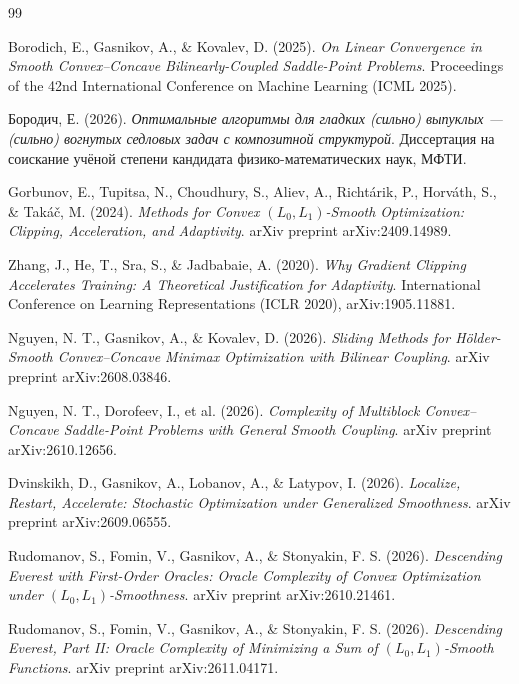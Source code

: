 \documentclass[11pt, a4paper]{article}
\theoremstyle{definition}
\begin{document}
\begin{thebibliography}{99}

Borodich, E., Gasnikov, A., \& Kovalev, D. (2025).
\emph{On Linear Convergence in Smooth Convex--Concave Bilinearly-Coupled Saddle-Point Problems}.
Proceedings of the 42nd International Conference on Machine Learning (ICML 2025).

Бородич, Е. (2026).
\emph{Оптимальные алгоритмы для гладких (сильно) выпуклых --- (сильно) вогнутых седловых задач с композитной структурой}.
Диссертация на соискание учёной степени кандидата физико-математических наук, МФТИ.

Gorbunov, E., Tupitsa, N., Choudhury, S., Aliev, A., Richt\'arik, P., Horv\'ath, S., \& Tak\'a\v{c}, M. (2024).
\emph{Methods for Convex $(L_0, L_1)$-Smooth Optimization: Clipping, Acceleration, and Adaptivity}.
arXiv preprint arXiv:2409.14989.

Zhang, J., He, T., Sra, S., \& Jadbabaie, A. (2020).
\emph{Why Gradient Clipping Accelerates Training: A Theoretical Justification for Adaptivity}.
International Conference on Learning Representations (ICLR 2020), arXiv:1905.11881.

Nguyen, N. T., Gasnikov, A., \& Kovalev, D. (2026).
\emph{Sliding Methods for H\"older-Smooth Convex--Concave Minimax Optimization with Bilinear Coupling}.
arXiv preprint arXiv:2608.03846.

Nguyen, N. T., Dorofeev, I., et al. (2026).
\emph{Complexity of Multiblock Convex--Concave Saddle-Point Problems with General Smooth Coupling}.
arXiv preprint arXiv:2610.12656.

Dvinskikh, D., Gasnikov, A., Lobanov, A., \& Latypov, I. (2026).
\emph{Localize, Restart, Accelerate: Stochastic Optimization under Generalized Smoothness}.
arXiv preprint arXiv:2609.06555.

Rudomanov, S., Fomin, V., Gasnikov, A., \& Stonyakin, F. S. (2026).
\emph{Descending Everest with First-Order Oracles: Oracle Complexity of Convex Optimization under $(L_0, L_1)$-Smoothness}.
arXiv preprint arXiv:2610.21461.

Rudomanov, S., Fomin, V., Gasnikov, A., \& Stonyakin, F. S. (2026).
\emph{Descending Everest, Part II: Oracle Complexity of Minimizing a Sum of $(L_0, L_1)$-Smooth Functions}.
arXiv preprint arXiv:2611.04171.

\end{thebibliography}
\end{document}
